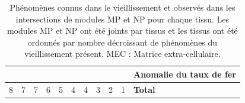 \begin{table}[hb]
{\begin{tabular}{@{}lllllllllll@{}}
\cellcolor[HTML]{F8A102} & \cellcolor[HTML]{F8A102}            & \cellcolor[HTML]{F8A102} & \cellcolor[HTML]{F8A102} &                          &                          &                          &                            &                          &                          & Anomalie du taux de fer                   \\
\midrule
8                        & 7                                   & 7                        & 6                        & 5                        & 4                        & 4                        & 3                          & 2                        & 1                        & \textbf{Total}                   
\end{tabular}
}
\caption[Phénomènes connus dans le vieillissement et observés dans les intersections de modules MP et NP pour chaque tissu]{Phénomènes connus dans le vieillissement et observés dans les intersections de modules MP et NP pour chaque tissu. Les modules MP et NP ont été joints par tissus et les tissus ont été ordonnés par nombre décroissant de phénomènes du vieillissement présent. MEC : Matrice extra-cellulaire.}
\label{table:intersection_aging_global_phenomenons}
\end{table}


